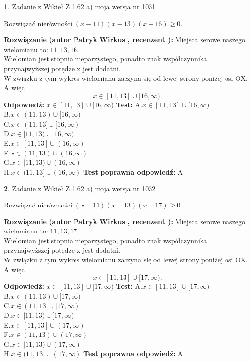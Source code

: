 \documentclass[12pt, a4paper]{article}
\theoremstyle{definition} %
\newtheorem{zad}{}
\newcommand{\zadStart}[1]{\begin{zad}#1\newline}
\newcommand{\zadStop}{\end{zad}}
\newcommand{\rozwStart}[2]{\noindent \textbf{Rozwiązanie (autor #1 , recenzent #2): }\newline}
\newcommand{\rozwStop}{\newline}
\newcommand{\odpStart}{\noindent \textbf{Odpowiedź:}\newline}
\newcommand{\odpStop}{\newline}
\newcommand{\testStart}{\noindent \textbf{Test:}\newline}
\newcommand{\testStop}{\newline}
\newcommand{\kluczStart}{\noindent \textbf{Test poprawna odpowiedź:}\newline}
\newcommand{\kluczStop}{\newline}
\begin{document}
\zadStart{Zadanie z Wikieł Z 1.62 a) moja wersja nr 1031}

Rozwiązać nierówności $(x-11)(x-13)(x-16)\ge0$.
\zadStop
\rozwStart{Patryk Wirkus}{}
Miejsca zerowe naszego wielomianu to: $11, 13, 16$.\\
Wielomian jest stopnia nieparzystego, ponadto znak współczynnika przy\linebreak najwyższej potędze x jest dodatni.\\ W związku z tym wykres wielomianu zaczyna się od lewej strony poniżej osi OX. A więc $$x \in [11,13] \cup [16,\infty).$$
\rozwStop
\odpStart
$x \in [11,13] \cup [16,\infty)$
\odpStop
\testStart
A.$x \in [11,13] \cup [16,\infty)$\\
B.$x \in (11,13) \cup [16,\infty)$\\
C.$x \in (11,13] \cup [16,\infty)$\\
D.$x \in [11,13) \cup [16,\infty)$\\
E.$x \in [11,13] \cup (16,\infty)$\\
F.$x \in (11,13) \cup (16,\infty)$\\
G.$x \in [11,13) \cup (16,\infty)$\\
H.$x \in (11,13] \cup (16,\infty)$
\testStop
\kluczStart
A
\kluczStop



\zadStart{Zadanie z Wikieł Z 1.62 a) moja wersja nr 1032}

Rozwiązać nierówności $(x-11)(x-13)(x-17)\ge0$.
\zadStop
\rozwStart{Patryk Wirkus}{}
Miejsca zerowe naszego wielomianu to: $11, 13, 17$.\\
Wielomian jest stopnia nieparzystego, ponadto znak współczynnika przy\linebreak najwyższej potędze x jest dodatni.\\ W związku z tym wykres wielomianu zaczyna się od lewej strony poniżej osi OX. A więc $$x \in [11,13] \cup [17,\infty).$$
\rozwStop
\odpStart
$x \in [11,13] \cup [17,\infty)$
\odpStop
\testStart
A.$x \in [11,13] \cup [17,\infty)$\\
B.$x \in (11,13) \cup [17,\infty)$\\
C.$x \in (11,13] \cup [17,\infty)$\\
D.$x \in [11,13) \cup [17,\infty)$\\
E.$x \in [11,13] \cup (17,\infty)$\\
F.$x \in (11,13) \cup (17,\infty)$\\
G.$x \in [11,13) \cup (17,\infty)$\\
H.$x \in (11,13] \cup (17,\infty)$
\testStop
\kluczStart
A
\kluczStop
\end{document}
